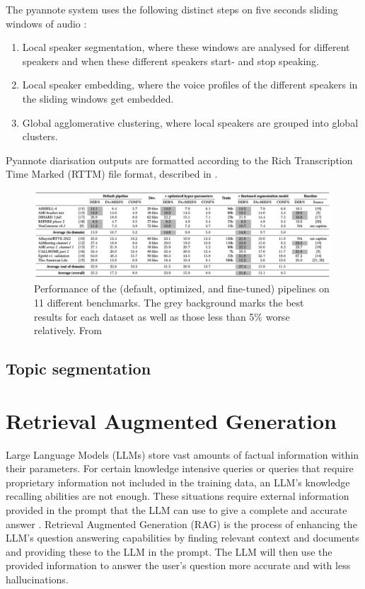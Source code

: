 \documentclass[twoside]{uva-inf-bachelor-thesis}
\begin{document}
The pyannote system uses the following distinct steps on five seconds sliding windows of audio \cite{bredin2023pyannote}: 
\begin{enumerate}
    \item Local speaker segmentation, where these windows are analysed for different speakers and when these different speakers start- and stop speaking.
    \item Local speaker embedding, where the voice profiles of the different speakers in the sliding windows get embedded.
    \item Global agglomerative clustering, where local speakers are grouped into global clusters. 
\end{enumerate}

Pyannote diarisation outputs are formatted according to the Rich Transcription Time Marked (RTTM) file format, described in \cite{ryant2018first}.

\begin{figure}
    \centering
    \includegraphics[width=0.99\textwidth]{images/pyanresults2.png}
    \caption{Performance of the (default, optimized, and fine-tuned) pipelines on 11 different benchmarks. The grey background marks the best results for each dataset as well as those less than 5\% worse relatively. From \cite{bredin2023pyannote}}
    \label{fig:pyanres}
\end{figure}

\subsection{Topic segmentation}
\lipsum[4]

\section{Retrieval Augmented Generation}
Large Language Models (LLMs) store vast amounts of factual information within their parameters. For certain knowledge intensive queries or queries that require proprietary information not included in the training data, an LLM's knowledge recalling abilities are not enough. These situations require external information provided in the prompt that the LLM can use to give a complete and accurate answer \cite{NEURIPS2020_6b493230}. Retrieval Augmented Generation (RAG) is the process of enhancing the LLM's question answering capabilities by finding relevant context and documents and providing these to the LLM in the prompt. The LLM will then use the provided information to answer the user's question more accurate and with less hallucinations.
\end{document}
